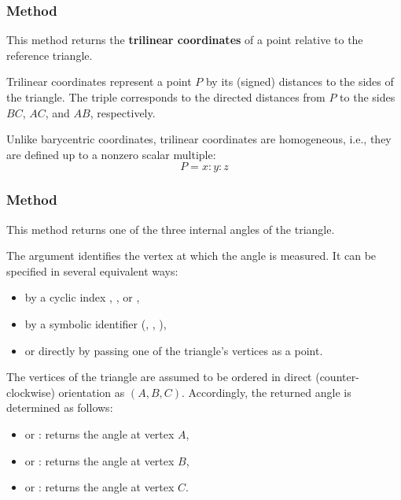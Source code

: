 \subsubsection{Method }
\label{ssub:triangle_trilinear_coordinates_pt}

This method returns the \textbf{trilinear coordinates} of a point relative to the reference triangle.

\medskip

Trilinear coordinates represent a point $P$ by its (signed) distances to the sides of the triangle. The triple  corresponds to the directed distances from $P$ to the sides $BC$, $AC$, and $AB$, respectively.

\begin{mybox}
\end{mybox}

\medskip

Unlike barycentric coordinates, trilinear coordinates are homogeneous, i.e., they are defined up to a nonzero scalar multiple:
\[
P = x : y : z
\]


\subsubsection{Method }
\label{ssub:method_triangle_get_angle}

This method returns one of the three internal angles of the triangle.

\medskip

The argument  identifies the vertex at which the angle is measured.
It can be specified in several equivalent ways:
\begin{itemize}
  \item by a cyclic index , , or ,
  \item by a symbolic identifier (, , ),
  \item or directly by passing one of the triangle’s vertices as a point.
\end{itemize}

\medskip

The vertices of the triangle are assumed to be ordered in direct
(counter-clockwise) orientation as $(A, B, C)$.
Accordingly, the returned angle is determined as follows:

\begin{itemize}
  \item {} or : returns the angle at vertex $A$,
  \item {} or : returns the angle at vertex $B$,
  \item {} or : returns the angle at vertex $C$.
\end{itemize}

